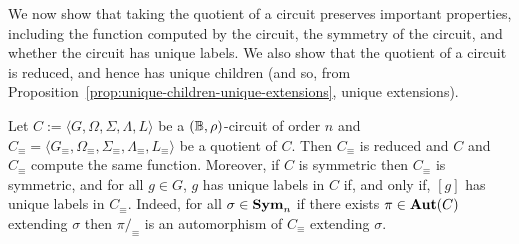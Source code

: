 \documentclass[../paper.tex]{subfiles}
\begin{document}
We now show that taking the quotient of a circuit preserves important
properties, including the function computed by the circuit, the symmetry of the
circuit, and whether the circuit has unique labels. We also show that the
quotient of a circuit is reduced, and hence has unique children (and so, from
Proposition~\ref{prop:unique-children-unique-extensions}, unique extensions).

\begin{lem}
  Let $C := \langle G, \Omega, \Sigma, \Lambda, L\rangle$ be a $(\mathbb{B},
  \rho)$-circuit of order $n$ and $C_{\equiv} = \langle G_\equiv ,
  \Omega_\equiv, \Sigma_\equiv , \Lambda_\equiv, L_\equiv \rangle$ be a quotient
  of $C$. Then $C_\equiv$ is reduced and $C$ and $C_{\equiv}$ compute the same
  function. Moreover, if $C$ is symmetric then $C_{\equiv}$ is symmetric, and
  for all $g \in G$, $g$ has unique labels in $C$ if, and only if, $[g]$ has
  unique labels in $C_{\equiv}$. Indeed, for all $\sigma \in \text{\textbf{Sym}}_n$ if there
  exists $\pi \in \text{\textbf{Aut}}(C)$ extending $\sigma$ then $\pi /_\equiv$ is an
  automorphism of $C_\equiv$ extending $\sigma$.
  \label{lem:quotient-circuits-preserve}
\end{lem}
\end{document}
